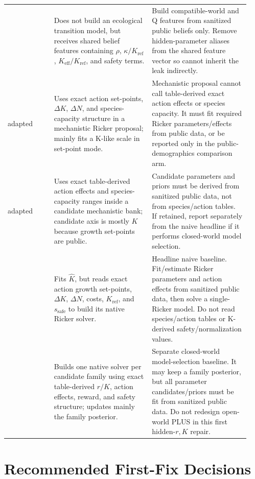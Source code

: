 \documentclass[11pt]{article}
\newcommand{\code}[1]{\texttt{\detokenize{#1}}}
\newcommand{\Keff}{K_{\mathrm{eff}}}
\newcommand{\Kref}{K_{\mathrm{ref}}}
\newcommand{\ssafe}{s_{\mathrm{safe}}}
\begin{document}
\begin{longtable}{p{0.18\linewidth}p{0.38\linewidth}p{0.38\linewidth}}
\code{delphic} &
Does not build an ecological transition model, but receives shared belief
features containing \(\rho\), \(\kappa/\Kref\), \(\Keff/\Kref\), and safety
terms. &
Build compatible-world and Q features from sanitized public beliefs only.
Remove hidden-parameter aliases from the shared feature vector so
\code{delphic} cannot inherit the leak indirectly. \\

adapted \code{moor} &
Uses exact action set-points, \(\Delta K\), \(\Delta N\), and species-capacity
structure in a mechanistic Ricker proposal; mainly fits a K-like scale in
set-point mode. &
Mechanistic proposal cannot call table-derived exact action effects or species
capacity. It must fit required Ricker parameters/effects from public data, or be
reported only in the public-demographics comparison arm. \\

adapted \code{plus} &
Uses exact table-derived action effects and species-capacity ranges inside a
candidate mechanistic bank; candidate axis is mostly \(K\) because growth
set-points are public. &
Candidate parameters and priors must be derived from sanitized public data, not
from species/action tables. If retained, report separately from the naive
headline if it performs closed-world model selection. \\

\code{moor_native} &
Fits \(\hat K\), but reads exact action growth set-points, \(\Delta K\),
\(\Delta N\), costs, \(\Kref\), and \(\ssafe\) to build its native Ricker
solver. &
Headline naive baseline. Fit/estimate Ricker parameters and action effects from
sanitized public data, then solve a single-Ricker model. Do not read
species/action tables or K-derived safety/normalization values. \\

\code{plus_native} &
Builds one native solver per candidate family using exact table-derived \(r/K\),
action effects, reward, and safety structure; updates mainly the family
posterior. &
Separate closed-world model-selection baseline. It may keep a family posterior,
but all parameter candidates/priors must be fit from sanitized public data. Do
not redesign open-world PLUS in this first hidden-\(r,K\) repair. \\
\bottomrule
\end{longtable}

\section{Recommended First-Fix Decisions}
\end{document}
